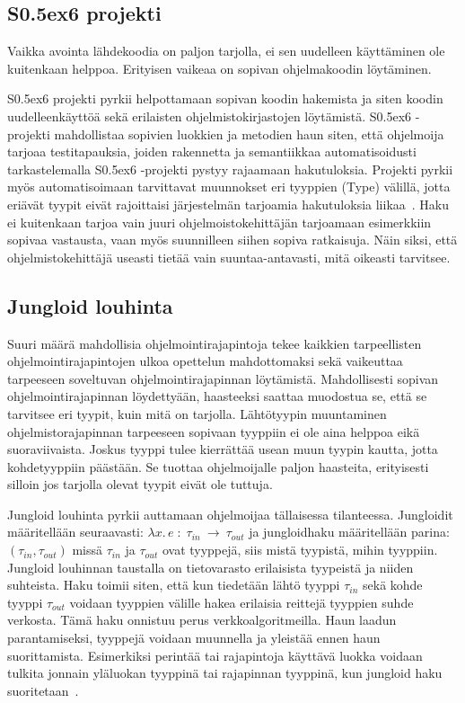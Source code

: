 \documentclass[finnish]{../tktltiki2}
\theoremstyle{definition}
\theoremstyle{remark}
\begin{document}
\subsection{S\raise0.5ex\hbox{6} projekti}
Vaikka avointa lähdekoodia on paljon tarjolla, ei sen uudelleen käyttäminen ole kuitenkaan helppoa. Erityisen vaikeaa on sopivan ohjelmakoodin löytäminen.

S\raise0.5ex\hbox{6} projekti pyrkii helpottamaan sopivan koodin hakemista ja siten koodin uudelleenkäyttöä sekä erilaisten ohjelmistokirjastojen löytämistä. S\raise0.5ex\hbox{6} -projekti mahdollistaa sopivien luokkien ja metodien haun siten, että ohjelmoija tarjoaa testitapauksia, joiden rakennetta ja semantiikkaa automatisoidusti tarkastelemalla S\raise0.5ex\hbox{6} -projekti pystyy rajaamaan hakutuloksia. Projekti pyrkii myös automatisoimaan tarvittavat muunnokset eri tyyppien (Type) välillä, jotta eriävät tyypit eivät rajoittaisi järjestelmän tarjoamia hakutuloksia liikaa~\cite{what-to-search-for}. Haku ei kuitenkaan tarjoa vain juuri ohjelmoistokehittäjän tarjoamaan esimerkkiin sopivaa vastausta, vaan myös suunnilleen siihen sopiva ratkaisuja. Näin siksi, että ohjelmistokehittäjä useasti tietää vain suuntaa-antavasti, mitä oikeasti tarvitsee.

\subsection{Jungloid louhinta}
Suuri määrä mahdollisia ohjelmointirajapintoja tekee kaikkien tarpeellisten ohjelmointirajapintojen ulkoa opettelun mahdottomaksi sekä vaikeuttaa tarpeeseen soveltuvan ohjelmointirajapinnan löytämistä. Mahdollisesti sopivan ohjelmointirajapinnan löydettyään, haasteeksi saattaa muodostua se, että se tarvitsee eri tyypit, kuin mitä on tarjolla. Lähtötyypin muuntaminen ohjelmistorajapinnan tarpeeseen sopivaan tyyppiin ei ole aina helppoa eikä suoraviivaista. Joskus tyyppi tulee kierrättää usean muun tyypin kautta, jotta kohdetyyppiin päästään. Se tuottaa ohjelmoijalle paljon haasteita, erityisesti silloin jos tarjolla olevat tyypit eivät ole tuttuja.

Jungloid louhinta pyrkii auttamaan ohjelmoijaa tällaisessa tilanteessa.
Jungloidit määritellään seuraavasti: $ \lambda x.\, e\; :\; \tau_{in}\:\to\:\tau_{out}$ ja jungloidhaku määritellään parina: $(\tau_{in}, \tau_{out})$ missä $\tau_{in}$ ja $\tau_{out}$ ovat tyyppejä, siis mistä tyypistä, mihin tyyppiin. Jungloid louhinnan taustalla on tietovarasto erilaisista tyypeistä ja niiden suhteista. Haku toimii siten, että kun tiedetään lähtö tyyppi $\tau_{in}$ sekä kohde tyyppi $\tau_{out}$ voidaan tyyppien välille hakea erilaisia reittejä tyyppien suhde verkosta. Tämä haku onnistuu perus verkkoalgoritmeilla. Haun laadun parantamiseksi, tyyppejä voidaan muunnella ja yleistää ennen haun suorittamista. Esimerkiksi perintää tai rajapintoja käyttävä luokka voidaan tulkita jonnain yläluokan tyyppinä tai rajapinnan tyyppinä, kun jungloid haku suoritetaan~\cite{jungloid-mining}.
\end{document}
